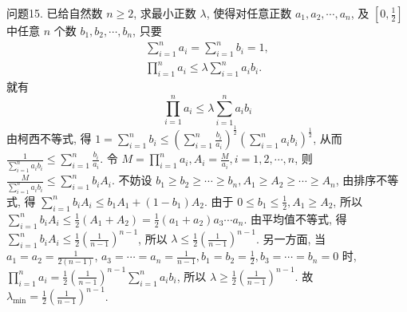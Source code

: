 问题15. 已给自然数 $n \geqslant 2$, 求最小正数 $\lambda$, 使得对任意正数 $a_1, a_2, \cdots, a_n$, 及 $\left[0, \frac{1}{2}\right]$ 中任意 $n$ 个数 $b_1, b_2, \cdots, b_n$, 只要
$$
\begin{gathered}
\sum_{i=1}^n a_i=\sum_{i=1}^n b_i=1, \\
\prod_{i=1}^n a_i \leqslant \lambda \sum_{i=1}^n a_i b_i .
\end{gathered}
$$
就有
$$
\prod_{i=1}^n a_i \leqslant \lambda \sum_{i=1}^n a_i b_i
$$
由柯西不等式, 得 $1=\sum_{i=1}^n b_i \leqslant\left(\sum_{i=1}^n \frac{b_i}{a_i}\right)^{\frac{1}{2}}\left(\sum_{i=1}^n a_i b_i\right)^{\frac{1}{2}}$, 从而 $\frac{1}{\sum_{i=1}^n a_i b_i} \leqslant \sum_{i=1}^n \frac{b_i}{a_i}$. 令 $M=\prod_{i=1}^n a_i, A_i=\frac{M}{a_i}, i=1,2, \cdots, n$, 则 $\frac{M}{\sum_{i=1}^n a_i b_i} \leqslant \sum_{i=1}^n b_i A_i$. 不妨设 $b_1 \geqslant b_2 \geqslant \cdots \geqslant b_n, A_1 \geqslant A_2 \geqslant \cdots \geqslant A_n$, 由排序不等式, 得 $\sum_{i=1}^n b_i A_i \leqslant b_1 A_1+\left(1-b_1\right) A_2$. 由于 $0 \leqslant b_1 \leqslant \frac{1}{2}, A_1 \geqslant A_2$, 所以 $\sum_{i=1}^n b_i A_i \leqslant\frac{1}{2}\left(A_1+A_2\right)=\frac{1}{2}\left(a_1+a_2\right) a_3 \cdots a_n$. 由平均值不等式, 得 $\sum_{i=1}^n b_i A_i \leqslant \frac{1}{2}\left(\frac{1}{n-1}\right)^{n-1}$, 所以 $\lambda \leqslant \frac{1}{2}\left(\frac{1}{n-1}\right)^{n-1}$. 另一方面, 当 $a_1=a_2=\frac{1}{2(n-1)}$, $a_3=\cdots=a_n=\frac{1}{n-1}, b_1=b_2=\frac{1}{2}, b_3=\cdots=b_n=0$ 时, $\prod_{i=1}^n a_i= \frac{1}{2}\left(\frac{1}{n-1}\right)^{n-1} \sum_{i=1}^n a_i b_i$, 所以 $\lambda \geqslant \frac{1}{2}\left(\frac{1}{n-1}\right)^{n-1}$. 故 $\lambda_{\min }=\frac{1}{2}\left(\frac{1}{n-1}\right)^{n-1}$.



